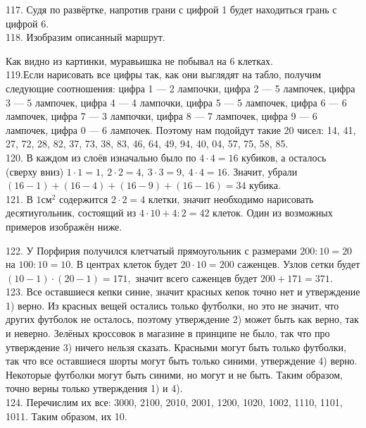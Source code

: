 117. Судя по развёртке, напротив грани с цифрой 1 будет находиться грань с цифрой 6.\\
118. Изобразим описанный маршрут.
\begin{center}
\begin{figure}[ht!]
\end{figure}
\end{center}
Как видно из картинки, муравьишка не побывал на 6 клетках.\\
119.Если нарисовать все цифры так, как они выглядят на табло, получим следующие соотношения: цифра 1 --- 2 лампочки, цифра 2 --- 5 лампочек, цифра 3 --- 5 лампочек, цифра 4 --- 4 лампочки, цифра 5 --- 5 лампочек, цифра 6 --- 6 лампочек, цифра 7 --- 3 лампочки, цифра 8 --- 7 лампочек, цифра 9 --- 6 лампочек, цифра 0 --- 6 лампочек. Поэтому нам подойдут такие 20 чисел: 14, 41, 27, 72, 28, 82, 37, 73, 38, 83, 46, 64, 49, 94, 40, 04, 57, 75, 58, 85.\\
120. В каждом из слоёв изначально было по $4\cdot4=16$ кубиков, а осталось (сверху вниз) $1\cdot1=1,\ 2\cdot2=4,\ 3\cdot3=9,\ 4\cdot4=16.$ Значит, убрали $(16-1)+(16-4)+(16-9)+(16-16)=34$ кубика.\\
121. В $1\text{см}^2$ содержится $2\cdot2=4$ клетки, значит необходимо нарисовать десятиугольник, состоящий из $4\cdot10+4:2=42$ клеток. Один из возможных примеров изображён ниже.
\begin{center}
\begin{figure}[ht!]
\end{figure}
\end{center}
122. У Порфирия получился клетчатый прямоугольник с размерами $200:10=20$ на $100:10=10.$ В центрах клеток будет $20\cdot10=200$ саженцев. Узлов сетки будет $(10-1)\cdot(20-1)=171,$ значит всего саженцев будет $200+171=371.$\\
123. Все оставшиеся кепки синие, значит красных кепок точно нет и утверждение 1) верно. Из красных вещей остались только футболки, но это не значит, что других футболок не осталось, поэтому утверждение 2) может быть как верно, так и неверно. Зелёных кроссовок в магазине в принципе не было, так что про утверждение 3) ничего нельзя сказать. Красными могут быть только футболки, так что все оставшиеся шорты могут быть только синими, утверждение 4) верно. Некоторые футболки могут быть синими, но могут и не быть. Таким образом, точно верны только утверждения 1) и 4).\\
124. Перечислим их все: 3000, 2100, 2010, 2001, 1200, 1020, 1002, 1110, 1101, 1011. Таким образом, их 10.\\
